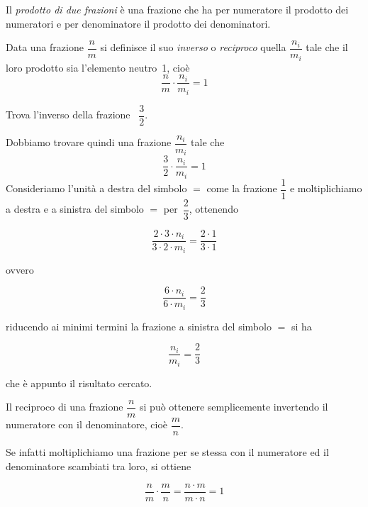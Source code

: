 \begin{definizione}
Il \emph{prodotto di due frazioni} è una frazione che ha per numeratore il prodotto dei numeratori
e per denominatore il prodotto dei denominatori.
\end{definizione}

\begin{center}
 
\end{center}

\ovalbox{\risolvii \ref{ese:3.51}, \ref{ese:3.52}, \ref{ese:3.53}, \ref{ese:3.54}, \ref{ese:3.55}}

\begin{definizione}
Data una frazione $\dfrac{n}{m}$ si definisce il suo \emph{inverso} o \emph{reciproco} quella $\dfrac{n_i}{m_i}$ tale che il loro prodotto sia l'elemento neutro~1, cioè
\[\frac{n}{m} \cdot \frac{n_i}{m_i} = 1\]
\end{definizione}

\begin{exrig}
\begin{esempio}
Trova l'inverso della frazione ~$\dfrac{3}{2}$.

Dobbiamo trovare quindi una frazione $\dfrac{n_i}{m_i}$ tale che
\[\frac{3}{2} \cdot \frac{n_i}{m_i} =1\]
Consideriamo l'unità a destra del simbolo $=$ come la frazione $\dfrac{1}{1}$ e moltiplichiamo a destra e a sinistra del simbolo $=$ per~$\dfrac{2}{3}$, ottenendo

\[\frac{2\cdot 3 \cdot n_i}{3\cdot 2 \cdot m_i} = \frac{2\cdot 1}{3\cdot 1}\]

\noindent ovvero

\[\frac{6 \cdot n_i}{6 \cdot m_i} = \frac{2}{3}\]

\noindent riducendo ai minimi termini la frazione a sinistra del simbolo $=$ si ha

\[\frac{n_i}{m_i} = \frac{2}{3}\]

\noindent che è appunto il risultato cercato.
\end{esempio}
\end{exrig}

\osservazione Il reciproco di una frazione $\dfrac{n}{m}$ si può ottenere semplicemente invertendo il numeratore con il denominatore, cioè $\dfrac{m}{n}$.

Se infatti moltiplichiamo una frazione per se stessa con il numeratore ed il denominatore scambiati tra loro, si ottiene

\[\frac{n}{m} \cdot \frac{m}{n} = \frac{n \cdot m}{m \cdot n} = 1\]

